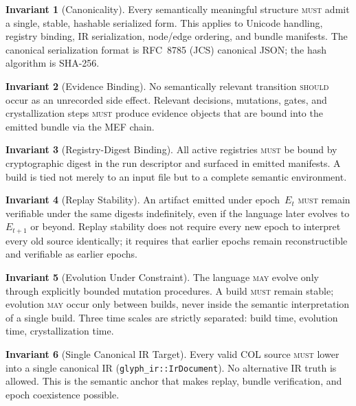 \documentclass[11pt,a4paper,twoside]{article}
\theoremstyle{definition}
\newtheorem{invariant}{Invariant}[section]
\theoremstyle{remark}
\newcommand{\must}{\textsc{must}}
\newcommand{\should}{\textsc{should}}
\newcommand{\may}{\textsc{may}}
\begin{document}
\begin{invariant}[Canonicality]
\label{inv:canonicality}
Every semantically meaningful structure \must{} admit a single, stable, hashable serialized form. This applies to Unicode handling, registry binding, IR serialization, node/edge ordering, and bundle manifests. The canonical serialization format is RFC~8785 (JCS) canonical JSON; the hash algorithm is SHA-256.
\end{invariant}

\begin{invariant}[Evidence Binding]
\label{inv:evidence}
No semantically relevant transition \should{} occur as an unrecorded side effect. Relevant decisions, mutations, gates, and crystallization steps \must{} produce evidence objects that are bound into the emitted bundle via the MEF chain.
\end{invariant}

\begin{invariant}[Registry-Digest Binding]
\label{inv:registry-digest}
All active registries \must{} be bound by cryptographic digest in the run descriptor and surfaced in emitted manifests. A build is tied not merely to an input file but to a complete semantic environment.
\end{invariant}

\begin{invariant}[Replay Stability]
\label{inv:replay}
An artifact emitted under epoch~$E_t$ \must{} remain verifiable under the same digests indefinitely, even if the language later evolves to $E_{t+1}$ or beyond. Replay stability does not require every new epoch to interpret every old source identically; it requires that earlier epochs remain reconstructible and verifiable as earlier epochs.
\end{invariant}

\begin{invariant}[Evolution Under Constraint]
\label{inv:evolution}
The language \may{} evolve only through explicitly bounded mutation procedures. A build \must{} remain stable; evolution \may{} occur only between builds, never inside the semantic interpretation of a single build. Three time scales are strictly separated: build time, evolution time, crystallization time.
\end{invariant}

\begin{invariant}[Single Canonical IR Target]
\label{inv:single-ir}
Every valid COL source \must{} lower into a single canonical IR (\texttt{glyph\_ir::IrDocument}). No alternative IR truth is allowed. This is the semantic anchor that makes replay, bundle verification, and epoch coexistence possible.
\end{invariant}
\end{document}
